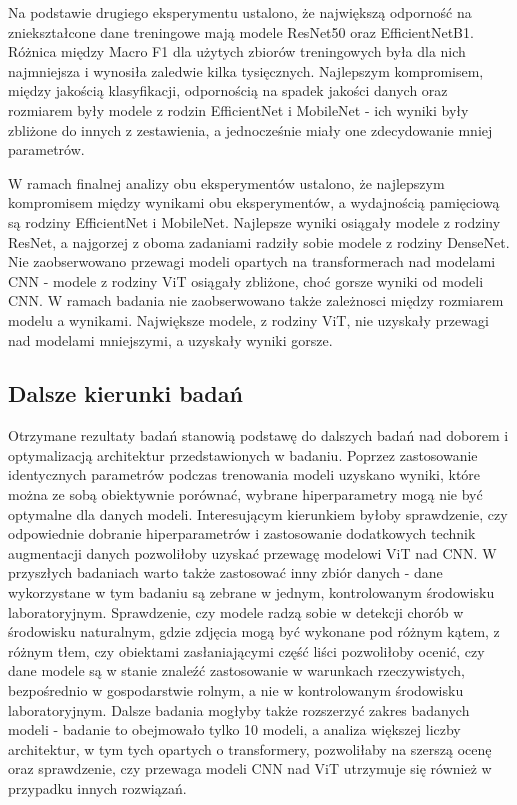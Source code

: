  Na podstawie drugiego eksperymentu ustalono, że największą odporność na zniekształcone dane treningowe mają modele ResNet50 oraz EfficientNetB1. Różnica między Macro F1 dla użytych zbiorów treningowych była dla nich najmniejsza i wynosiła zaledwie kilka tysięcznych. Najlepszym kompromisem, między jakością klasyfikacji, odpornością na spadek jakości danych oraz rozmiarem były modele z rodzin EfficientNet i MobileNet - ich wyniki były zbliżone do innych z zestawienia, a jednocześnie miały one zdecydowanie mniej parametrów.
 
 W ramach finalnej analizy obu eksperymentów ustalono, że najlepszym kompromisem między wynikami obu eksperymentów, a wydajnością pamięciową są rodziny EfficientNet i MobileNet. Najlepsze wyniki osiągały modele z rodziny ResNet, a najgorzej z oboma zadaniami radziły sobie modele z rodziny DenseNet. Nie zaobserwowano przewagi modeli opartych na transformerach nad modelami CNN - modele z rodziny ViT osiągały zbliżone, choć gorsze wyniki od modeli CNN. W ramach badania nie zaobserwowano także zależnosci między rozmiarem modelu a wynikami. Największe modele, z rodziny ViT, nie uzyskały przewagi nad modelami mniejszymi, a uzyskały wyniki gorsze. 
 
 
 \subsection{Dalsze kierunki badań}
 Otrzymane rezultaty badań stanowią podstawę do dalszych badań nad doborem i optymalizacją architektur przedstawionych w badaniu. Poprzez zastosowanie identycznych parametrów podczas trenowania modeli uzyskano wyniki, które można ze sobą obiektywnie porównać, wybrane hiperparametry mogą nie być optymalne dla danych modeli. Interesującym kierunkiem byłoby sprawdzenie, czy odpowiednie dobranie hiperparametrów i zastosowanie dodatkowych technik augmentacji danych pozwoliłoby uzyskać przewagę modelowi ViT nad CNN. W przyszłych badaniach warto także zastosować inny zbiór danych - dane wykorzystane w tym badaniu są zebrane w jednym, kontrolowanym środowisku laboratoryjnym. Sprawdzenie, czy modele radzą sobie w detekcji chorób \newline w środowisku naturalnym, gdzie zdjęcia mogą być wykonane pod różnym kątem, z różnym tłem, czy obiektami zasłaniającymi część liści pozwoliłoby ocenić, czy  dane modele są \newline w stanie znaleźć zastosowanie w warunkach rzeczywistych, bezpośrednio w gospodarstwie rolnym, a nie w kontrolowanym środowisku laboratoryjnym.  Dalsze badania mogłyby także rozszerzyć zakres badanych modeli - badanie to obejmowało tylko 10 modeli, \newline a analiza większej liczby architektur, w tym tych opartych o transformery, pozwoliłaby na szerszą ocenę oraz sprawdzenie, czy przewaga modeli CNN nad ViT utrzymuje się również w przypadku innych rozwiązań.
  
 


